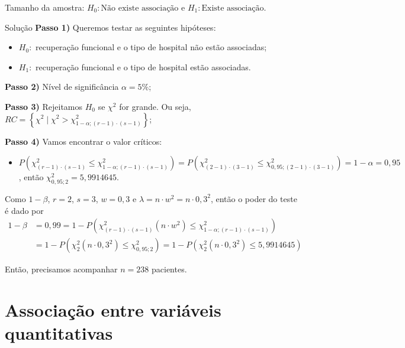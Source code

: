 \documentclass[9pt]{beamer}
\begin{document}
\begin{frame}{Tamanho da amostra: $H_0:\mbox{Não existe associação}$ e $H_1:\mbox{Existe associação} $.}

\small
\begin{block}{Solução}
	\textbf{Passo 1)} Queremos testar as seguintes hipóteses:
	\begin{itemize}
		\item $H_0:$ recuperação funcional e o tipo de hospital não estão associadas;
		\item $H_1:$ recuperação funcional e o tipo de hospital estão associadas.
	\end{itemize}
	
	\textbf{Passo 2)} Nível de significância $\alpha=5\%$;
	
	\textbf{Passo 3)} Rejeitamos $H_0$ se $\chi^2$ for grande. Ou seja, $RC =\left\{ \chi^2 \mid \chi^2 > \chi^2_{1-\alpha; (r-1)\cdot (s-1)} \right\}$;
	
	\textbf{Passo 4)} Vamos encontrar o valor críticos:
	\begin{itemize}
		\item $P\left( \chi^2_{(r-1)\cdot (s-1)} \leq \chi^2_{1-\alpha;(r-1)\cdot (s-1)} \right) = P\left( \chi^2_{(2-1)\cdot (3-1)} \leq \chi^2_{0,95;(2-1)\cdot (3-1)} \right) = \allowbreak 1-\alpha=0,95$, então $\chi^2_{0,95;2} = 5,9914645$.
	\end{itemize}
	
	Como $1-\beta$, $r=2$, $s=3$, $w=0,3$ e $\lambda = n \cdot w^2 = n \cdot 0,3^2$, então o poder do teste é dado por
	\begin{align*}
	1-\beta &= 0,99 = 1 - P\left( \chi_{(r-1)\cdot (s-1)}^2(n \cdot w^2) \leq \chi_{1-\alpha; (r-1)\cdot (s-1)}^2 \right)\\
	&= 1 - P\left( \chi_{2}^2(n \cdot 0,3^2) \leq \chi_{0,95; 2}^2 \right) = 1 - P\left( \chi_{2}^2(n \cdot 0,3^2) \leq 5,9914645 \right)
	\end{align*}
\end{block}
Então, precisamos acompanhar $n=238$ pacientes.
\normalsize

\end{frame}

\section{Associação entre variáveis quantitativas}
\end{document}

